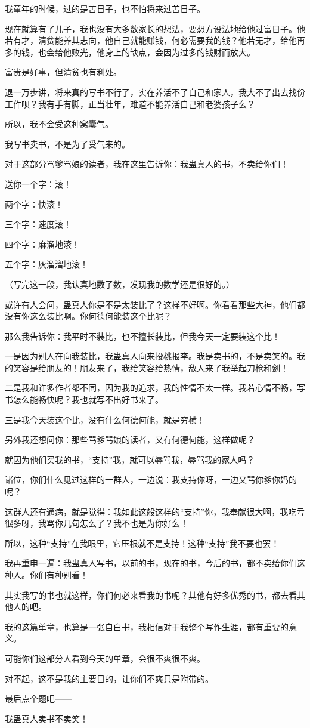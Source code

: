 \begin{this_body}
我童年的时候，过的是苦日子，也不怕将来过苦日子。

现在就算有了儿子，我也没有大多数家长的想法，要想方设法地给他过富日子。他若有才，清贫能养其志向，他自己就能赚钱，何必需要我的钱？他若无才，给他再多的钱，也会给他败光，他身上的缺点，会因为过多的钱财而放大。

富贵是好事，但清贫也有利处。

退一万步讲，将来真的写书不行了，实在养活不了自己和家人，我大不了出去找份工作呗？我有手有脚，正当壮年，难道不能养活自己和老婆孩子么？

所以，我不会受这种窝囊气。

我写书卖书，不是为了受气来的。

对于这部分骂爹骂娘的读者，我在这里告诉你：我蛊真人的书，不卖给你们！

送你一个字：滚！

两个字：快滚！

三个字：速度滚！

四个字：麻溜地滚！

五个字：灰溜溜地滚！

（写完这一段，我认真地数了数，发现我的数学还是很好的。）

或许有人会问，蛊真人你是不是太装比了？这样不好啊。你看看那些大神，他们都没有你这么装比啊。你何德何能装这个比呢？

那么我告诉你：我平时不装比，也不擅长装比，但我今天一定要装这个比！

一是因为别人在向我装比，我蛊真人向来投桃报李。我是卖书的，不是卖笑的。我的笑容是给朋友的！朋友来了，我给笑容给热情，敌人来了我举起刀枪和剑！

二是我和许多作者都不同，因为我的追求，我的性情不太一样。我若心情不畅，写书怎么能畅快呢？我也就写不出好书来了。

三是我今天装这个比，没有什么何德何能，就是穷横！

另外我还想问你：那些骂爹骂娘的读者，又有何德何能，这样做呢？

就因为他们买我的书，“支持”我，就可以辱骂我，辱骂我的家人吗？

诸位，你们什么见过这样的一群人，一边说：我支持你呀，一边又骂你爹你妈的呢？

这群人还有通病，就是觉得：我如此这般这样的“支持”你，我奉献很大啊，我吃亏很多呀，我骂你几句怎么了？我不也是为你好么！

所以，这种“支持”在我眼里，它压根就不是支持！这种“支持”我不要也罢！

我再重申一遍：我蛊真人写书，以前的书，现在的书，今后的书，都不卖给你们这种人。你们有种别看！

其实我写的书也就这样，你们何必来看我的书呢？其他有好多优秀的书，都去看其他人的吧。

我的这篇单章，也算是一张自白书，我相信对于我整个写作生涯，都有重要的意义。

可能你们这部分人看到今天的单章，会很不爽很不爽。

对不起，这不是我的主要目的，让你们不爽只是附带的。

最后点个题吧——

我蛊真人卖书不卖笑！

\end{this_body}

